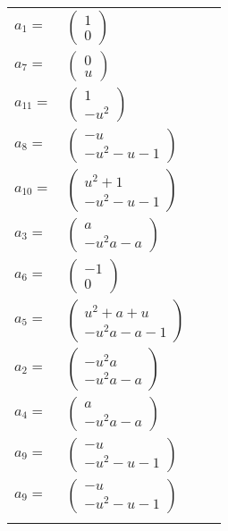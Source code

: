 \documentclass[1p]{elsarticle_modified}
\theoremstyle{definition}
\begin{document}
\begin{tabular}{m{7pt} m{180pt} m{7pt} m{180pt} }
\flushright $a_{1}=$&$\begin{pmatrix}1\\0\end{pmatrix}$ \\
\flushright $a_{7}=$&$\begin{pmatrix}0\\u\end{pmatrix}$ \\
\flushright $a_{11}=$&$\begin{pmatrix}1\\- u^2\end{pmatrix}$ \\
\flushright $a_{8}=$&$\begin{pmatrix}- u\\- u^2- u-1\end{pmatrix}$ \\
\flushright $a_{10}=$&$\begin{pmatrix}u^2+1\\- u^2- u-1\end{pmatrix}$ \\
\flushright $a_{3}=$&$\begin{pmatrix}a\\- u^2 a- a\end{pmatrix}$ \\
\flushright $a_{6}=$&$\begin{pmatrix}-1\\0\end{pmatrix}$ \\
\flushright $a_{5}=$&$\begin{pmatrix}u^2+a+u\\- u^2 a- a-1\end{pmatrix}$ \\
\flushright $a_{2}=$&$\begin{pmatrix}- u^2 a\\- u^2 a- a\end{pmatrix}$ \\
\flushright $a_{4}=$&$\begin{pmatrix}a\\- u^2 a- a\end{pmatrix}$ \\
\flushright $a_{9}=$&$\begin{pmatrix}- u\\- u^2- u-1\end{pmatrix}$\\ \flushright $a_{9}=$&$\begin{pmatrix}- u\\- u^2- u-1\end{pmatrix}$\\&\end{tabular}
\end{document}
